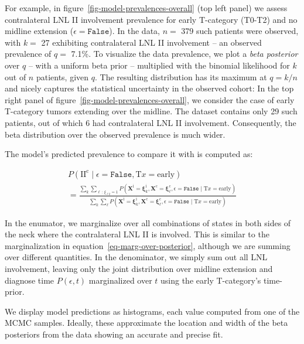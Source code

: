 \documentclass[
  sn-mathphys-num,
]{sn-jnl}
\begin{document}
For example, in figure~\ref{fig-model-prevalences-overall} (top left
panel) we assess contralateral LNL II involvement prevalence for early
T-category (T0-T2) and no midline extension
(\(\epsilon=\texttt{False}\)). In the data, \(n=\) 379 such patients
were observed, with \(k=\) 27 exhibiting contralateral LNL II
involvement -- an observed prevalence of \(q=\) 7.1\%. To visualize the
data prevalence, we plot a \emph{beta posterior} over \(q\) -- with a
uniform beta prior -- multiplied with the binomial likelihood for \(k\)
out of \(n\) patients, given \(q\). The resulting distribution has its
maximum at \(q=k / n\) and nicely captures the statistical uncertainty
in the observed cohort: In the top right panel of
figure~\ref{fig-model-prevalences-overall}, we consider the case of
early T-category tumors extending over the midline. The dataset contains
only 29 such patients, out of which 6 had contralateral LNL II
involvement. Consequently, the beta distribution over the observed
prevalence is much wider.

The model's predicted prevalence to compare it with is computed as:

\[
\begin{multlined}
P \left( \text{II}^\text{c} \mid \epsilon=\texttt{False}, \text{T}x=\text{early} \right) \\ = \frac{ \sum_k \sum_{\ell \, : \, \xi_{\ell 2}=1}  P \left( \mathbf{X}^\text{i}=\boldsymbol{\xi}_k^\text{i}, \mathbf{X}^\text{c}=\boldsymbol{\xi}_\ell^\text{c}, \epsilon=\texttt{False} \mid \text{T}x=\text{early} \right)}{ \sum_k \sum_\ell P \left(\mathbf{X}^\text{i}=\boldsymbol{\xi}_k^\text{i}, \mathbf{X}^\text{c}=\boldsymbol{\xi}_\ell^\text{c}, \epsilon=\texttt{False} \mid \text{T}x=\text{early} \right)}
\end{multlined}
\]

In the enumator, we marginalize over all combinations of states in both
sides of the neck where the contralateral LNL II is involved. This is
similar to the marginalization in equation~\ref{eq-marg-over-posterior},
although we are summing over different quantities. In the denominator,
we simply sum out all LNL involvement, leaving only the joint
distribution over midline extension and diagnose time
\(P \left( \epsilon, t \right)\) marginalized over \(t\) using the early
T-category's time-prior.

We display model predictions as histograms, each value computed from one
of the MCMC samples. Ideally, these approximate the location and width
of the beta posteriors from the data showing an accurate and precise
fit.
\end{document}
